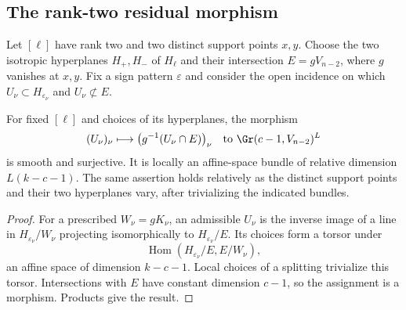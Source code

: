 \subsection{The rank-two residual morphism}
Let $[\ell]$ have rank two and two distinct support points $x,y$.
Choose the two isotropic hyperplanes $H_+,H_-$ of $H_\ell$ and their
intersection $E=gV_{n-2}$, where $g$ vanishes at $x,y$.
Fix a sign pattern $\varepsilon$ and consider the open incidence on which
$U_\nu\subset H_{\varepsilon_\nu}$ and $U_\nu\not\subset E$.
\begin{proposition}\label{prop:residual-dominance}
For fixed $[\ell]$ and choices of its hyperplanes, the morphism
\begin{equation}\label{eq:residual-morphism}
 (U_\nu)_\nu\longmapsto
 \bigl(g^{-1}(U_\nu\cap E)\bigr)_\nu
 \quad\hbox{to }\Gr(c-1,V_{n-2})^L
\end{equation}
is smooth and surjective. It is locally an affine-space bundle of
relative dimension $L(k-c-1)$.
The same assertion holds relatively as the distinct support points and
their two hyperplanes vary, after trivializing the indicated bundles.
\end{proposition}
\begin{proof}
For a prescribed $W_\nu=gK_\nu$, an admissible $U_\nu$ is the inverse
image of a line in $H_{\varepsilon_\nu}/W_\nu$ projecting isomorphically
to $H_{\varepsilon_\nu}/E$. Its choices form a torsor under
\[
 \operatorname{Hom}(H_{\varepsilon_\nu}/E,E/W_\nu),
\]
an affine space of dimension $k-c-1$. Local choices of a splitting
trivialize this torsor. Intersections with $E$ have constant dimension
$c-1$, so the assignment is a morphism. Products give the result.
\end{proof}

